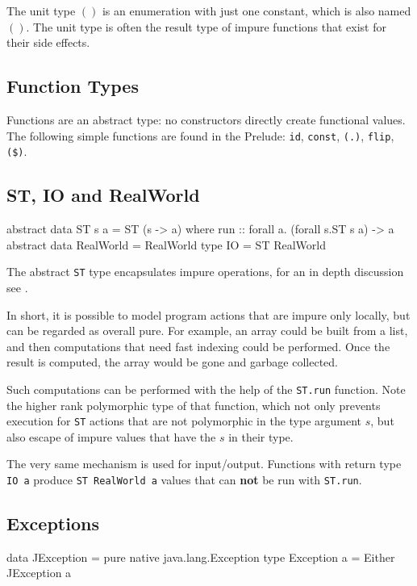 The unit type $()$ is an enumeration with just one constant, which is also named $()$. 
The unit type is often the result type of impure functions that exist for their side effects.


\subsection{Function Types}

Functions are an abstract type: no constructors directly create functional values.
The following simple functions are found in the Prelude: \texttt{id}, \texttt{const}, \texttt{(.)}, \texttt{flip}, \texttt{(\$)}.

\subsection{ST, IO and RealWorld}

\begin{code}
abstract data ST s a = ST (s -> a)
    where  run :: forall a. (forall s.ST s a) -> a
abstract data RealWorld = RealWorld
type IO = ST RealWorld 
\end{code}

The abstract \texttt{ST} type encapsulates impure operations, for an in depth discussion see \cite{lazyst}.

In short, it is possible to model program actions that are impure only locally, but can be regarded as overall pure. For example, an array could be built from a list, and then computations  that need fast indexing could be performed. Once the result is computed, the array would be gone and garbage collected.

Such computations can be performed with the help of the \texttt{ST.run} function. Note the higher rank polymorphic type of that function, which not only prevents execution for \texttt{ST} actions that are not polymorphic in the type argument $s$, but also escape of impure values that have the $s$ in their type.

The very same mechanism is used for input/output. Functions with return type \texttt{IO a} produce \texttt{ST RealWorld a} values that can \textbf{not} be run with \texttt{ST.run}.


\subsection{Exceptions}

\begin{code}
data JException = pure native java.lang.Exception
type Exception a = Either JException a
\end{code}

